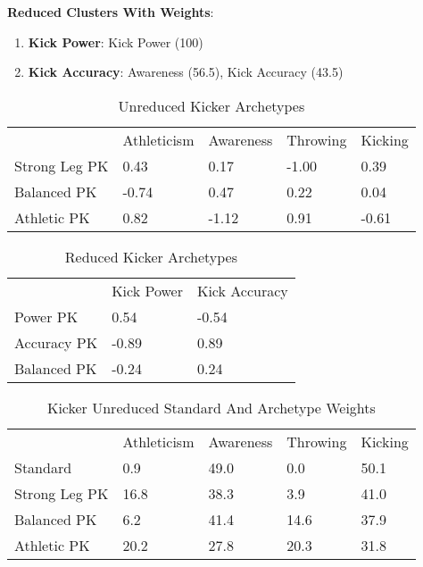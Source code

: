 \documentclass[11pt]{article}
\begin{document}
\textbf{Reduced Clusters With Weights}:

\begin{enumerate}
\item{\textbf{Kick Power}}: Kick Power (100)
\item{\textbf{Kick Accuracy}}: Awareness (56.5), Kick Accuracy (43.5)
\end{enumerate}

\begin{table}[]
\centering
\caption{Unreduced Kicker Archetypes}
\label{UnreducedKicker}
\begin{tabular}{lllll}
              & Athleticism & Awareness & Throwing & Kicking \\
Strong Leg PK & 0.43        & 0.17      & -1.00    & 0.39    \\
Balanced PK   & -0.74       & 0.47      & 0.22     & 0.04    \\
Athletic PK   & 0.82        & -1.12     & 0.91     & -0.61  
\end{tabular}
\end{table}

\begin{table}[]
\centering
\caption{Reduced Kicker Archetypes}
\label{ReducedKicker}
\begin{tabular}{lll}
            & Kick Power & Kick Accuracy \\
Power PK    & 0.54       & -0.54         \\
Accuracy PK & -0.89      & 0.89          \\
Balanced PK & -0.24      & 0.24         
\end{tabular}
\end{table}

\begin{table}[]
\centering
\caption{Kicker Unreduced Standard And Archetype Weights}
\label{KickerUnreducedWeights}
\begin{tabular}{lllll}
              & Athleticism & Awareness & Throwing & Kicking \\
Standard       & 0.9         & 49.0      & 0.0      & 50.1    \\
Strong Leg PK & 16.8        & 38.3      & 3.9      & 41.0    \\
Balanced PK   & 6.2         & 41.4      & 14.6     & 37.9    \\
Athletic PK   & 20.2        & 27.8      & 20.3     & 31.8   
\end{tabular}
\end{table}
\end{document}
